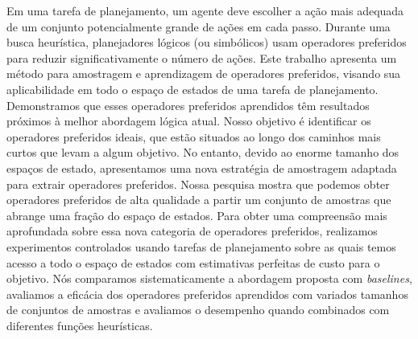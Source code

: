 \documentclass[ppgc,diss,english]{iiufrgs}
\begin{document}
\begin{translatedabstract}
Em uma tarefa de planejamento, um agente deve escolher a ação mais adequada de um conjunto potencialmente grande de ações em cada passo. Durante uma busca heurística, planejadores lógicos (ou simbólicos) usam operadores preferidos para reduzir significativamente o número de ações. Este trabalho apresenta um método para amostragem e aprendizagem de operadores preferidos, visando sua aplicabilidade em todo o espaço de estados de uma tarefa de planejamento. Demonstramos que esses operadores preferidos aprendidos têm resultados próximos à melhor abordagem lógica atual.
Nosso objetivo é identificar os operadores preferidos ideais, que estão situados ao longo dos caminhos mais curtos que levam a algum objetivo. No entanto, devido ao enorme tamanho dos espaços de estado, apresentamos uma nova estratégia de amostragem adaptada para extrair operadores preferidos. Nossa pesquisa mostra que podemos obter operadores preferidos de alta qualidade a partir um conjunto de amostras que abrange uma fração do espaço de estados.
Para obter uma compreensão mais aprofundada sobre essa nova categoria de operadores preferidos, realizamos experimentos controlados usando tarefas de planejamento sobre as quais temos acesso a todo o espaço de estados com estimativas perfeitas de custo para o objetivo. Nós comparamos sistematicamente a abordagem proposta com \textit{baselines}, avaliamos a eficácia dos operadores preferidos aprendidos com variados tamanhos de conjuntos de amostras e avaliamos o desempenho quando combinados com diferentes funções heurísticas.
\end{translatedabstract}
\end{document}
